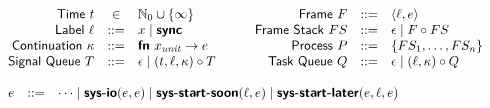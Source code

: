 $$
\begin{array}{l}
\begin{array}{rcl @{\hspace{3em}} rcl}
  \sfid{Time}\ t              & \in & \mathbb{N}_0 \cup \{\infty\}                              & \sfid{Frame}\ F         & ::= & \langle \ell, e \rangle \\
\sfid{Label}\ \ell          & ::= & x \mid \bsfid{sync}                    & \sfid{Frame\ Stack}\ FS & ::= & \epsilon \mid F \circ FS \\
\sfid{Continuation}\ \kappa & ::= & \bsfid{fn}\ x_{\mathit{unit}} \to e    & \sfid{Process}\ P       & ::= & \{ FS_1, \dots, FS_n \} \\
\sfid{Signal\ Queue}\ T     & ::= & \epsilon \mid (t, \ell, \kappa) \circ T & \sfid{Task\ Queue}\ Q   & ::= & \epsilon \mid (\ell, \kappa) \circ Q 
\end{array} \\
\\
\begin{array}{rcl}
e & ::= & \dots \mid \bsfid{sys-io}(e, e) \mid \bsfid{sys-start-soon}(\many{\ell,e}) \mid \bsfid{sys-start-later}(e, \ell, e)
\end{array}
\end{array}
$$
